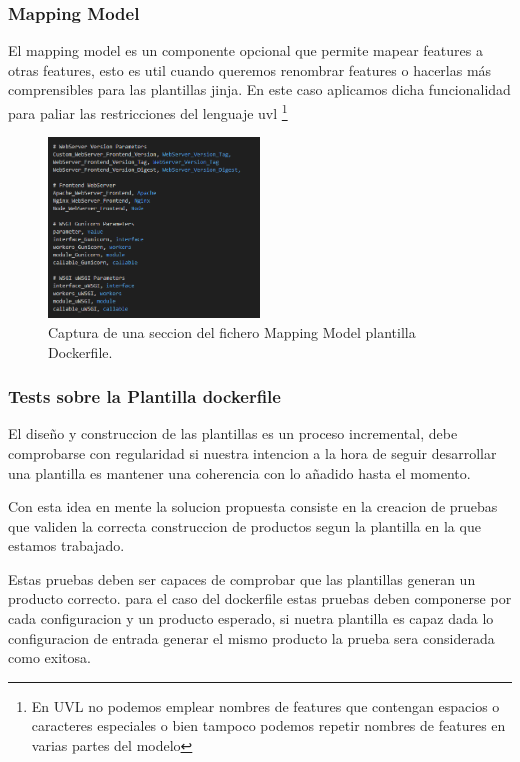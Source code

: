 \documentclass[12pt, a4paper, twoside]{article}
\begin{document}
\newpage

\subsubsection{Mapping Model}
El mapping model es un componente opcional que permite mapear features a otras features, esto es util cuando queremos renombrar features o hacerlas más comprensibles para las plantillas jinja.
En este caso aplicamos dicha funcionalidad para paliar las restricciones del lenguaje uvl \footnote{En UVL no podemos emplear nombres de features que contengan espacios o caracteres especiales o bien tampoco podemos repetir nombres de features en varias partes del modelo}
\begin{figure}[h]
	\centering
	  \includegraphics[width=0.5\textwidth]{mapping_model_screenshot.png}
	\caption{Captura de una seccion del fichero Mapping Model plantilla Dockerfile.}
\end{figure}

\newpage

\subsubsection{Tests sobre la Plantilla dockerfile}
El diseño y construccion de las plantillas es un proceso incremental, debe comprobarse con regularidad si nuestra intencion a la hora de seguir desarrollar una plantilla es mantener una coherencia con lo añadido hasta el momento. 

Con esta idea en mente la solucion propuesta consiste en la creacion de pruebas que validen la correcta construccion de productos segun la plantilla en la que estamos trabajado.

Estas pruebas deben ser capaces de comprobar que las plantillas generan un producto correcto. para el caso del dockerfile estas pruebas deben componerse por cada configuracion 
y un producto esperado, si nuetra plantilla es capaz dada lo configuracion de entrada generar el mismo producto la prueba sera considerada como exitosa. 
\end{document}
